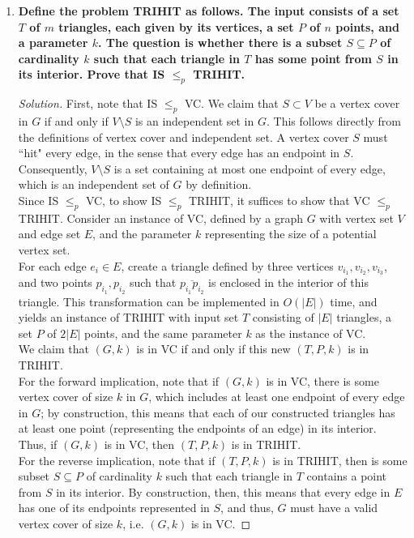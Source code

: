 \documentclass[11pt]{article}
\newenvironment{solution}
  {\renewcommand\qedsymbol{$\blacksquare$}\begin{proof}[Solution]}
  {\end{proof}}
\begin{document}
\begin{enumerate}
\newpage

\item{\textbf{Define the problem TRIHIT as follows. The input consists of a set $T$ of $m$ triangles, each
given by its vertices, a set $P$ of $n$ points, and a parameter $k$. The question is whether there
is a subset $S \subseteq P$ of cardinality $k$ such that each triangle in $T$ has some point from $S$ in its
interior. Prove that IS $\leq_p$ TRIHIT.}}

\begin{solution} First, note that IS $\leq_p$ VC. We claim that $S\subset V$ be a vertex cover in $G$ if and only if $V \setminus S$ is an independent set in $G$. This follows directly from the definitions of vertex cover and independent set. A vertex cover $S$ must ``hit" every edge, in the sense that every edge has an endpoint in $S$. Consequently, $V \setminus S$ is a set containing at most one endpoint of every edge, which is an independent set of $G$ by definition. \\

Since IS $\leq_p$ VC, to show IS $\leq_p$ TRIHIT, it suffices to show that VC $\leq_p$ TRIHIT. Consider an instance of VC, defined by a graph $G$ with vertex set $V$ and edge set $E$, and the parameter $k$ representing the size of a potential vertex set. \\

For each edge $e_i \in E$, create a triangle defined by three vertices $v_{i_1}, v_{i_2}, v_{i_3}$, and two points $p_{i_1}, p_{i_2}$ such that $\overline{p_{i_1}p_{i_2}}$ is enclosed in the interior of this triangle. This transformation can be implemented in $O(|E|)$ time, and yields an instance of TRIHIT with input set $T$ consisting of $|E|$ triangles, a set $P$ of $2|E|$ points, and the same parameter $k$ as the instance of VC. \\

We claim that $(G, k)$ is in VC if and only if this new $(T, P, k)$ is in TRIHIT. \\

For the forward implication, note that if $(G, k)$ is in VC, there is some vertex cover of size $k$ in $G$, which includes at least one endpoint of every edge in $G$; by construction, this means that each of our constructed triangles has at least one point (representing the endpoints of an edge) in its interior. Thus, if $(G, k)$ is in VC, then $(T, P, k)$ is in TRIHIT. \\

For the reverse implication, note that if $(T, P, k)$ is in TRIHIT, then is some subset $S \subseteq P$ of cardinality $k$ such that each triangle in $T$ contains a point from $S$ in its interior. By construction, then, this means that every edge in $E$ has one of its endpoints represented in $S$, and thus, $G$ must have a valid vertex cover of size $k$, i.e. $(G, k)$ is in VC. \end{solution}

\end{enumerate}
\end{document}
